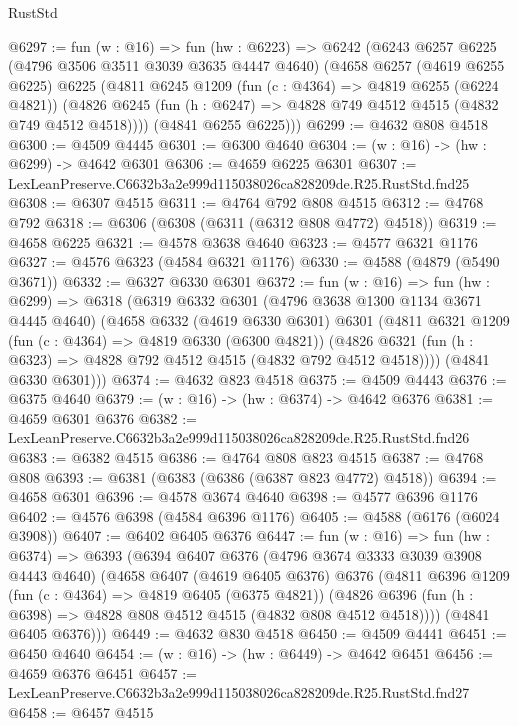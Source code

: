 \begin{lexlean}{RustStd}
\begin{coremodule}
@6297 := fun (w : @16) =>
  fun (hw : @6223) =>
  @6242
    (@6243
      @6257
      @6225
      (@4796 @3506 @3511 @3039 @3635 @4447 @4640)
      (@4658
        @6257
        (@4619 @6255 @6225)
        @6225
        (@4811
          @6245
          @1209
          (fun (c : @4364) => @4819 @6255 (@6224 @4821))
          (@4826 @6245 (fun (h : @6247) => @4828 @749 @4512 @4515 (@4832 @749 @4512 @4518))))
        (@4841 @6255 @6225)))
@6299 := @4632 @808 @4518
@6300 := @4509 @4445
@6301 := @6300 @4640
@6304 := (w : @16) -> (hw : @6299) -> @4642 @6301
@6306 := @4659 @6225 @6301
@6307 := LexLeanPreserve.C6632b3a2e999d115038026ca828209de.R25.RustStd.fnd25
@6308 := @6307 @4515
@6311 := @4764 @792 @808 @4515
@6312 := @4768 @792
@6318 := @6306 (@6308 (@6311 (@6312 @808 @4772) @4518))
@6319 := @4658 @6225
@6321 := @4578 @3638 @4640
@6323 := @4577 @6321 @1176
@6327 := @4576 @6323 (@4584 @6321 @1176)
@6330 := @4588 (@4879 (@5490 @3671))
@6332 := @6327 @6330 @6301
@6372 := fun (w : @16) =>
  fun (hw : @6299) =>
  @6318
    (@6319
      @6332
      @6301
      (@4796 @3638 @1300 @1134 @3671 @4445 @4640)
      (@4658
        @6332
        (@4619 @6330 @6301)
        @6301
        (@4811
          @6321
          @1209
          (fun (c : @4364) => @4819 @6330 (@6300 @4821))
          (@4826 @6321 (fun (h : @6323) => @4828 @792 @4512 @4515 (@4832 @792 @4512 @4518))))
        (@4841 @6330 @6301)))
@6374 := @4632 @823 @4518
@6375 := @4509 @4443
@6376 := @6375 @4640
@6379 := (w : @16) -> (hw : @6374) -> @4642 @6376
@6381 := @4659 @6301 @6376
@6382 := LexLeanPreserve.C6632b3a2e999d115038026ca828209de.R25.RustStd.fnd26
@6383 := @6382 @4515
@6386 := @4764 @808 @823 @4515
@6387 := @4768 @808
@6393 := @6381 (@6383 (@6386 (@6387 @823 @4772) @4518))
@6394 := @4658 @6301
@6396 := @4578 @3674 @4640
@6398 := @4577 @6396 @1176
@6402 := @4576 @6398 (@4584 @6396 @1176)
@6405 := @4588 (@6176 (@6024 @3908))
@6407 := @6402 @6405 @6376
@6447 := fun (w : @16) =>
  fun (hw : @6374) =>
  @6393
    (@6394
      @6407
      @6376
      (@4796 @3674 @3333 @3039 @3908 @4443 @4640)
      (@4658
        @6407
        (@4619 @6405 @6376)
        @6376
        (@4811
          @6396
          @1209
          (fun (c : @4364) => @4819 @6405 (@6375 @4821))
          (@4826 @6396 (fun (h : @6398) => @4828 @808 @4512 @4515 (@4832 @808 @4512 @4518))))
        (@4841 @6405 @6376)))
@6449 := @4632 @830 @4518
@6450 := @4509 @4441
@6451 := @6450 @4640
@6454 := (w : @16) -> (hw : @6449) -> @4642 @6451
@6456 := @4659 @6376 @6451
@6457 := LexLeanPreserve.C6632b3a2e999d115038026ca828209de.R25.RustStd.fnd27
@6458 := @6457 @4515

\end{coremodule}
\end{lexlean}
